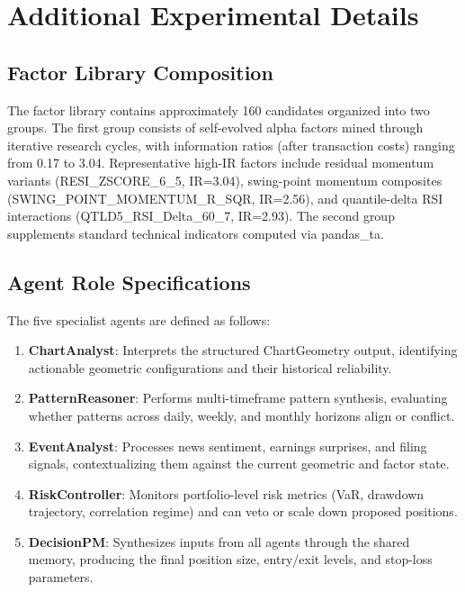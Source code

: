 \appendix
\onecolumn

\section{Additional Experimental Details}
\label{sec:appendix_details}

\subsection{Factor Library Composition}

The factor library contains approximately 160 candidates organized into two groups. The first group consists of self-evolved alpha factors mined through iterative research cycles, with information ratios (after transaction costs) ranging from 0.17 to 3.04. Representative high-IR factors include residual momentum variants (RESI\_ZSCORE\_6\_5, IR=3.04), swing-point momentum composites (SWING\_POINT\_MOMENTUM\_R\_SQR, IR=2.56), and quantile-delta RSI interactions (QTLD5\_RSI\_Delta\_60\_7, IR=2.93). The second group supplements standard technical indicators computed via pandas\_ta.

\subsection{Agent Role Specifications}

The five specialist agents are defined as follows:
\begin{enumerate}
    \item \textbf{ChartAnalyst}: Interprets the structured ChartGeometry output, identifying actionable geometric configurations and their historical reliability.
    \item \textbf{PatternReasoner}: Performs multi-timeframe pattern synthesis, evaluating whether patterns across daily, weekly, and monthly horizons align or conflict.
    \item \textbf{EventAnalyst}: Processes news sentiment, earnings surprises, and filing signals, contextualizing them against the current geometric and factor state.
    \item \textbf{RiskController}: Monitors portfolio-level risk metrics (VaR, drawdown trajectory, correlation regime) and can veto or scale down proposed positions.
    \item \textbf{DecisionPM}: Synthesizes inputs from all agents through the shared memory, producing the final position size, entry/exit levels, and stop-loss parameters.
\end{enumerate}

